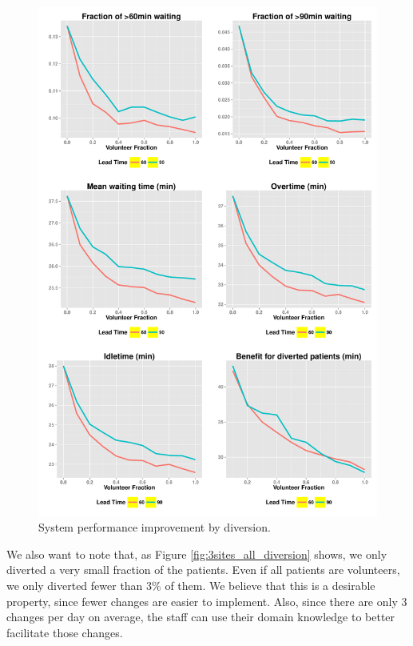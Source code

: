 \begin{figure}[htp]
\centering
\includegraphics[width=.95\textwidth]{chap3/numeric/pic/3sites_all}
\caption{System performance improvement by diversion.}
\label{fig:3sites_all}
\end{figure}

We also want to note that, as Figure \ref{fig:3sites_all_diversion} shows,
we only diverted a very small fraction of the patients. Even if all patients
are volunteers, we only diverted fewer than 3\% of them.
We believe that this is a desirable property, since fewer changes are easier
to implement. Also, since there are only 3 changes per day on average,
the staff can use their domain knowledge to better facilitate those
changes.

